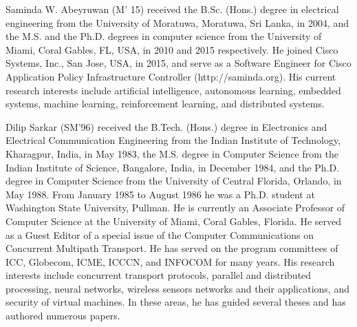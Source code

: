 \documentclass[]{IEEEtran}
\begin{document}


\begin{IEEEbiography}
{Saminda W. Abeyruwan} (M’ 15) received the B.Sc. (Hons.) degree in electrical engineering from the University of Moratuwa, Moratuwa, Sri Lanka, in 2004, and the M.S. and the Ph.D. degrees in computer science from the University of Miami, Coral Gables, FL, USA, in 2010 and 2015 respectively.
He joined Cisco Systems, Inc., San Jose, USA, in 2015, and serve as a Software Engineer for Cisco Application Policy Infrastructure Controller (http://saminda.org). His current research interests include artificial intelligence, autonomous learning, embedded systems, machine learning, reinforcement learning, and distributed systems.
\end{IEEEbiography}
\begin{IEEEbiography}
{Dilip Sarkar} 
(SM'96) received the B.Tech. (Hons.) degree in Electronics and Electrical Communication Engineering from the Indian Institute of Technology, Kharagpur, India, in May 1983, the M.S. degree in Computer Science from the Indian Institute of Science, Bangalore, India, in December 1984, and the Ph.D. degree in Computer Science from the University of Central Florida, Orlando, in May 1988. From January 1985 to August 1986 he was a Ph.D. student at Washington State University, Pullman. He is currently an Associate Professor of Computer Science at the University of Miami, Coral Gables, Florida. 
He served as a Guest Editor of a special issue of the Computer Communications on Concurrent Multipath Transport. He has served on the program committees of ICC, Globecom, ICME, ICCCN, and INFOCOM for many years. His research interests include concurrent transport protocols, parallel and distributed processing, neural networks, wireless sensors networks and their applications, and security of virtual machines. In these areas, he has guided several theses and has authored numerous papers.
\end{IEEEbiography}
\end{document}
